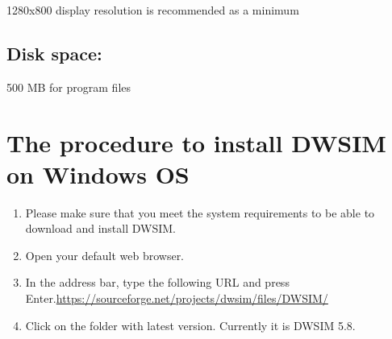\documentclass[12pt,a4paper]{article}
\begin{document}
1280x800 display resolution is recommended as a minimum

\subsection*{Disk space:}	

500 MB for program files

\section{The procedure to install DWSIM on Windows OS}

\begin{enumerate}
\item Please make sure that you meet the system requirements to be able to download and install DWSIM.
\item Open your default web browser.
\item In the address bar, type the following URL and press Enter.\newline \url{https://sourceforge.net/projects/dwsim/files/DWSIM/}

\item Click on the folder with latest version. Currently it is DWSIM 5.8.


\end{enumerate}
\end{document}
